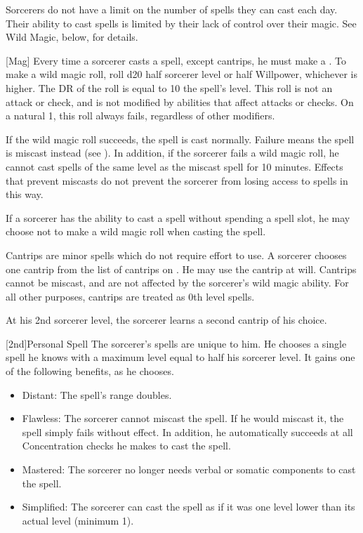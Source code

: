         Sorcerers do not have a limit on the number of spells they can cast each day.
        Their ability to cast spells is limited by their lack of control over their magic.
        See Wild Magic, below, for details.

        [Mag]\label{Wild Magic}
        Every time a sorcerer casts a spell, except cantrips, he must make a .
        To make a wild magic roll, roll d20 \add half sorcerer level or half Willpower, whichever is higher.
        The DR of the roll is equal to 10 \add the spell's level.
        This roll is not an attack or check, and is not modified by abilities that affect attacks or checks.
        On a natural 1, this roll always fails, regardless of other modifiers.

        If the wild magic roll succeeds, the spell is cast normally.
        Failure means the spell is miscast instead (see ).
        In addition, if the sorcerer fails a wild magic roll, he cannot cast spells of the same level as the miscast spell for 10 minutes.
        Effects that prevent miscasts do not prevent the sorcerer from losing access to spells in this way.

        If a sorcerer has the ability to cast a spell without spending a spell slot, he may choose not to make a wild magic roll when casting the spell.

        Cantrips are minor spells which do not require effort to use.
        A sorcerer chooses one cantrip from the list of cantrips on .
        He may use the cantrip at will.
        Cantrips cannot be miscast, and are not affected by the sorcerer's wild magic ability.
        For all other purposes, cantrips are treated as 0th level spells.

        At his 2nd sorcerer level, the sorcerer learns a second cantrip of his choice.

        [2nd]{Personal Spell}
        The sorcerer's spells are unique to him.
        He chooses a single spell he knows with a maximum level equal to half his sorcerer level.
        It gains one of the following benefits, as he chooses.
        \begin{itemize}
            \item Distant: The spell's range doubles.
            \item Flawless: The sorcerer cannot miscast the spell.
                If he would miscast it, the spell simply fails without effect.
                In addition, he automatically succeeds at all Concentration checks he makes to cast the spell.
            \item Mastered: The sorcerer no longer needs verbal or somatic components to cast the spell.
            \item Simplified: The sorcerer can cast the spell as if it was one level lower than its actual level (minimum 1).
        \end{itemize}

